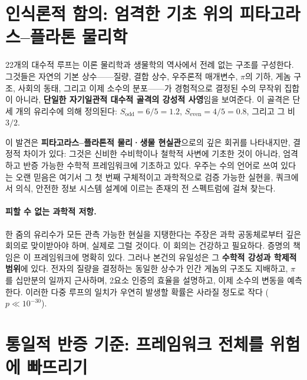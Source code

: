 \documentclass[12pt,a4paper]{article}
\begin{document}
	\section*{인식론적 함의: 엄격한 기초 위의 피타고라스–플라톤 물리학}
	
	22개의 대수적 루프는 이론 물리학과 생물학의 역사에서 전례 없는 구조를 구성한다. 그것들은 자연의 기본 상수——질량, 결합 상수, 우주론적 매개변수, \(\pi\)의 기하, 게놈 구조, 사회의 동태, 그리고 이제 소수의 분포——가 경험적으로 결정된 수의 무작위 집합이 아니라, \textbf{단일한 자기일관적 대수적 골격의 강성적 사영}임을 보여준다. 이 골격은 단 세 개의 유리수에 의해 정의된다: \(S_{\mathrm{odd}} = 6/5 = 1.2\), \(S_{\mathrm{even}} = 4/5 = 0.8\), 그리고 그 비 \(3/2\).
	
	이 발견은 \textbf{피타고라스–플라톤적 물리·생물 현실관}으로의 깊은 회귀를 나타내지만, 결정적 차이가 있다: 그것은 신비한 수비학이나 철학적 사변에 기초한 것이 아니라, 엄격하고 반증 가능한 수학적 프레임워크에 기초하고 있다. 우주는 수의 언어로 쓰여 있다는 오랜 믿음은 여기서 그 첫 번째 구체적이고 과학적으로 검증 가능한 실현을, 쿼크에서 의식, 안전한 정보 시스템 설계에 이르는 존재의 전 스펙트럼에 걸쳐 찾는다.
	
	\paragraph{피할 수 없는 과학적 저항.}
	한 줌의 유리수가 모든 관측 가능한 현실을 지탱한다는 주장은 과학 공동체로부터 깊은 회의로 맞이받아야 하며, 실제로 그럴 것이다. 이 회의는 건강하고 필요하다. 증명의 책임은 이 프레임워크에 명확히 있다. 그러나 본건의 유일성은 그 \textbf{수학적 강성과 학제적 범위}에 있다. 전자의 질량을 결정하는 동일한 상수가 인간 게놈의 구조도 지배하고, \(\pi\)를 십만분의 일까지 근사하며, 2요소 인증의 효율을 설명하고, 이제 소수의 변동을 예측한다. 이러한 다중 루프의 일치가 우연히 발생할 확률은 사라질 정도로 작다 (\(p \ll 10^{-30}\)).
	
	\section*{통일적 반증 기준: 프레임워크 전체를 위험에 빠뜨리기}
	
\end{document}
